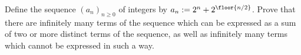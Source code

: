 Define the sequence $(a_n)_{n\geq 0}$ of integers by $a_n:=2^n+2^{\floor{n/2}}$.
Prove that there are infinitely many terms of the sequence which can be expressed as
a sum of two or more distinct terms of the sequence,
as well as infinitely many terms which cannot be expressed in such a way.
